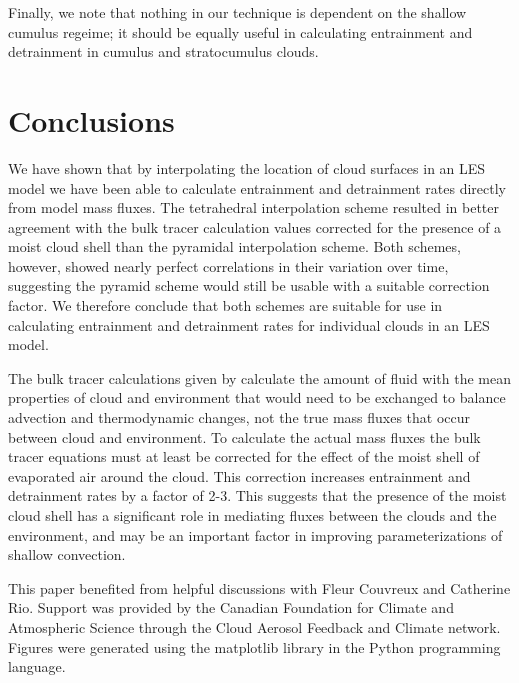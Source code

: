 \documentclass[12pt]{article}
\begin{document}
Finally, we note that nothing in our technique is dependent on the shallow 
cumulus regeime; it should be equally useful in calculating entrainment and 
detrainment in cumulus and stratocumulus clouds.


\section{Conclusions}

We have shown that by interpolating the location of cloud surfaces in an LES
model we have been able to calculate entrainment and detrainment rates directly 
from model mass fluxes.  The tetrahedral interpolation scheme resulted in
better agreement with the bulk tracer calculation values corrected for the 
presence of a moist cloud shell than the pyramidal interpolation scheme.  Both 
schemes, however, showed nearly perfect correlations in their variation over 
time, suggesting the pyramid scheme would still be usable with a suitable 
correction factor.  We therefore conclude that both schemes are suitable for 
use in calculating entrainment and detrainment rates for individual clouds in 
an LES model.

The bulk tracer calculations given by \cite{Siebesma1995} calculate the amount
of fluid with the mean properties of cloud and environment that would need to
be exchanged to balance advection and thermodynamic changes, not the true mass
fluxes that occur between cloud and environment.  To calculate the actual mass
fluxes the bulk tracer equations must at least be corrected for the effect of
the moist shell of evaporated air around the cloud.  This correction increases
entrainment and detrainment rates by a factor of 2-3.  This suggests that the
presence of the moist cloud shell has a significant role in mediating fluxes
between the clouds and the environment, and may be an important factor in 
improving parameterizations of shallow convection.



\begin{acknowledgment}
This paper benefited from helpful discussions with Fleur Couvreux and Catherine Rio.
Support was provided by the Canadian Foundation for Climate and Atmospheric
Science through the Cloud Aerosol Feedback and Climate network.
Figures were generated using the matplotlib library in the Python
programming language.
\end{acknowledgment}
\end{document}
